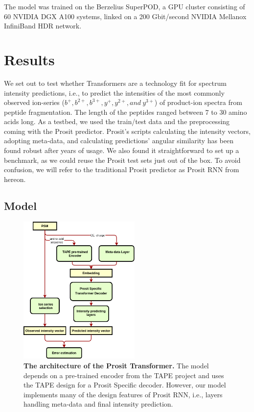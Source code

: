 \documentclass[10pt,a4paper]{article}
\begin{document}
The model was trained on the Berzelius SuperPOD, a GPU cluster consisting of 60 NVIDIA DGX A100 systems, linked on a 200 Gbit/second NVIDIA Mellanox InfiniBand HDR network.

\section*{Results}
We set out to test whether Transformers are a technology fit for spectrum intensity predictions, i.e., to predict the intensities of the most commonly observed ion-series ($b^+, b^{2+}, b^{3+}, y^{+}, y^{2+}, and\ y^{3+}$) of product-ion spectra from peptide fragmentation. The length of the peptides ranged between 7 to 30  amino acids long. As a testbed, we used the train/test data and the preprocessing coming with the Prosit predictor. Prosit’s scripts calculating the intensity vectors, adopting meta-data, and calculating predictions’ angular similarity has been found robust after years of usage. We also found it straightforward to set up a benchmark, as we could reuse the Prosit test sets just out of the box. To avoid confusion, we will refer to the traditional Prosit predictor as Prosit RNN from hereon.

\subsection*{Model}

\begin{figure}[htb!]
    \centering
    \includegraphics[width=6cm]{./img/architecture.png}
    \caption{{\bf The architecture of the Prosit Transformer.} The model depends on a pre-trained encoder from the TAPE project and uses the TAPE design for a Prosit Specific decoder. However, our model implements many of the design features of Prosit RNN, i.e., layers handling meta-data and final intensity prediction. \label{fig:architecture}}
\end{figure}
    
\end{document}
